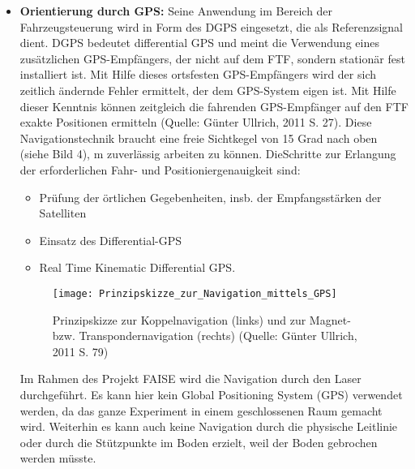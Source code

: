 \begin{itemize}
\item \textbf{Orientierung durch GPS:} Seine Anwendung im Bereich der Fahrzeugsteuerung wird in Form des DGPS eingesetzt, die als Referenzsignal dient. DGPS bedeutet differential GPS und meint die Verwendung eines zus\"atzlichen GPS-Empf\"angers, der nicht auf dem FTF, sondern station\"ar fest installiert ist. Mit Hilfe dieses ortsfesten GPS-Empf\"angers wird der sich zeitlich \"andernde Fehler ermittelt, der dem GPS-System eigen ist. Mit Hilfe dieser Kenntnis k\"onnen zeitgleich die fahrenden GPS-Empf\"anger auf den FTF exakte Positionen ermitteln (Quelle: G\"unter Ullrich, 2011 S. 27). Diese Navigationstechnik braucht eine freie Sichtkegel von 15 Grad  nach oben (siehe Bild 4), m zuverl\"assig arbeiten zu k\"onnen. DieSchritte zur Erlangung der erforderlichen Fahr- und Positioniergenauigkeit sind:
\begin{itemize}
 \item Pr\"ufung der \"ortlichen Gegebenheiten, insb. der Empfangsst\"arken der Satelliten
 \item Einsatz des Differential-GPS
 \item Real Time Kinematic Differential GPS. 
\end{itemize}
	\begin{figure}[h!]
	\centering
  \texttt{[image: Prinzipskizze\_zur\_Navigation\_mittels\_GPS]}
	\caption{Prinzipskizze zur Koppelnavigation (links) und zur Magnet- bzw. Transpondernavigation (rechts) (Quelle: G\"unter Ullrich, 2011 S. 79)}
	\label{Systemarchitektur_FTS}
\end{figure}
Im Rahmen des Projekt FAISE wird die Navigation durch den Laser durchgef\"uhrt. Es kann hier kein Global Positioning System (GPS) verwendet werden, da das ganze Experiment in einem geschlossenen Raum gemacht wird. Weiterhin es kann auch keine Navigation durch die physische Leitlinie oder durch die St\"utzpunkte im Boden erzielt, weil der Boden gebrochen werden m\"usste.
\end{itemize}

